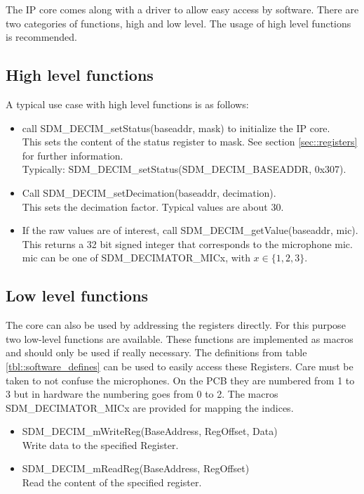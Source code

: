 The IP core comes along with a driver to allow easy access by software.
There are two categories of functions, high and low level.
The usage of high level functions is recommended.

\subsection{High level functions}
A typical use case with high level functions is as follows:
\begin{itemize}
	\item call SDM\_DECIM\_setStatus(baseaddr, mask) to initialize the IP core. \\
		This sets the content of the status register to mask. See section \ref{sec::registers} for further information.\\
		Typically: SDM\_DECIM\_setStatus(SDM\_DECIM\_BASEADDR, 0x307).
	\item Call SDM\_DECIM\_setDecimation(baseaddr, decimation). \\
		This sets the decimation factor. Typical values are about 30.
	\item If the raw values are of interest, call SDM\_DECIM\_getValue(baseaddr, mic).\\
		This returns a 32 bit signed integer that corresponds to the microphone mic. \\
		mic can be one of SDM\_DECIMATOR\_MICx, with $x\in\{1,2,3\}$.
\end{itemize}

\subsection{Low level functions}
The core can also be used by addressing the registers directly.
For this purpose two low-level functions are available.
These functions are implemented as macros and should only be used if really necessary.
The definitions from table \ref{tbl::software_defines} can be used to easily access these Registers.
Care must be taken to not confuse the microphones. 
On the PCB they are numbered from 1 to 3 but in hardware the numbering goes from 0 to 2.
The macros SDM\_DECIMATOR\_MICx are provided for mapping the indices.

\begin{itemize}
	\item SDM\_DECIM\_mWriteReg(BaseAddress, RegOffset, Data) \\
		Write data to the specified Register. 
	\item SDM\_DECIM\_mReadReg(BaseAddress, RegOffset) \\		
		Read the content of the specified register.
\end{itemize}

